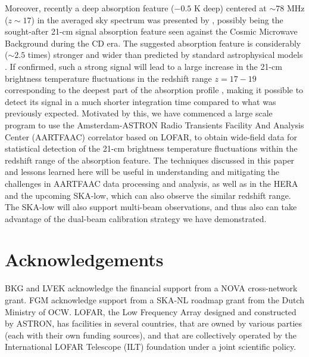 \documentclass[fleqn,usenatbib]{mnras}
\begin{document}
Moreover, recently a deep absorption feature ($-0.5$ K deep) centered at $\sim78$ MHz ($z \sim 17 $) in the averaged sky spectrum was presented by \cite{bowman2018}, possibly being the sought-after 21-cm signal absorption feature seen against the Cosmic Microwave Background during the CD era. The suggested absorption feature is considerably ($\sim 2.5$ times) stronger and wider than predicted by standard astrophysical models \citep{barkana2018}. If confirmed, such a strong signal will lead to a large increase in the 21-cm brightness temperature fluctuations in the redshift range $z = 17-19$ corresponding to the deepest part of the absorption profile \citep{barkana2018,fialkov2018}, making it possible to detect its signal in a much shorter integration time compared to what was previously expected. Motivated by this, we have commenced a large scale program to use the Amsterdam-ASTRON Radio Transients Facility And Analysis Center (AARTFAAC) correlator based on LOFAR, to obtain wide-field data for statistical detection of the 21-cm brightness temperature fluctuations within the redshift range of the absorption feature. The techniques discussed in this paper and lessons learned here will be useful in understanding and mitigating the challenges in AARTFAAC data processing and analysis, as well as in the HERA and the upcoming SKA-low, which can also observe the similar redshift range. The SKA-low will also support multi-beam observations, and thus also can take advantage of the dual-beam calibration strategy we have demonstrated.

\section*{Acknowledgements}

BKG and LVEK acknowledge the financial support from a NOVA cross-network grant. FGM acknowledge support from a SKA-NL roadmap grant from the Dutch Ministry of OCW. LOFAR, the Low Frequency Array designed and constructed by ASTRON, has facilities in several countries, that are owned by various parties (each with their own funding sources), and that are collectively operated by the International LOFAR Telescope (ILT) foundation under a joint scientific policy.



\end{document}
